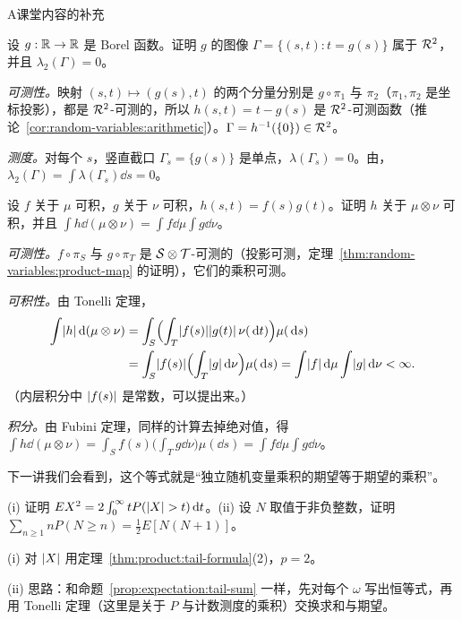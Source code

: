 \begin{exercises}{A}{课堂内容的补充}
\item\label{ex:product:A3} 设 $g:\mathbb{R}\to\mathbb{R}$ 是 Borel 函数。证明 $g$ 的图像 $\Gamma=\{(s,t):t=g(s)\}$ 属于 $\mathcal{R}^2$，并且 $\lambda_2(\Gamma)=0$。
\begin{solution}
\emph{可测性。}映射 $(s,t)\mapsto(g(s),t)$ 的两个分量分别是 $g\circ\pi_1$ 与 $\pi_2$（$\pi_1,\pi_2$ 是坐标投影），都是 $\mathcal{R}^2$-可测的，所以 $h(s,t)=t-g(s)$ 是 $\mathcal{R}^2$-可测函数（推论~\ref{cor:random-variables:arithmetic}）。$\Gamma=h^{-1}(\{0\})\in\mathcal{R}^2$。

\emph{测度。}对每个 $s$，竖直截口 $\Gamma_s=\{g(s)\}$ 是单点，$\lambda(\Gamma_s)=0$。由，$\lambda_2(\Gamma)=\int\lambda(\Gamma_s)\dd s=0$。
\end{solution}

\item\label{ex:product:A4} 设 $f$ 关于 $\mu$ 可积，$g$ 关于 $\nu$ 可积，$h(s,t)=f(s)g(t)$。证明 $h$ 关于 $\mu\otimes\nu$ 可积，并且 $\int h\dd(\mu\otimes\nu)=\int f\dd\mu\int g\dd\nu$。
\begin{solution}
\emph{可测性。}$f\circ\pi_S$ 与 $g\circ\pi_T$ 是 $\mathcal{S}\otimes\mathcal{T}$-可测的（投影可测，定理~\ref{thm:random-variables:product-map} 的证明），它们的乘积可测。

\emph{可积性。}由 Tonelli 定理，
\[
\begin{aligned}
\int\lvert h\rvert\,\mathrm{d}(\mu\otimes\nu)&=\int_S\Bigl(\int_T\lvert f(s)\rvert\lvert g(t)\rvert\,\nu(\,\mathrm{d} t)\Bigr)\mu(\,\mathrm{d} s)\\
&=\int_S\lvert f(s)\rvert\Bigl(\int_T\lvert g\rvert\,\mathrm{d}\nu\Bigr)\mu(\,\mathrm{d} s)=\int\lvert f\rvert\,\mathrm{d}\mu\int\lvert g\rvert\,\mathrm{d}\nu<\infty .
\end{aligned}
\]
（内层积分中 $\lvert f(s)\rvert$ 是常数，可以提出来。）

\emph{积分。}由 Fubini 定理，同样的计算去掉绝对值，得 $\int h\dd(\mu\otimes\nu)=\int_Sf(s)\bigl(\int_Tg\dd\nu\bigr)\mu(\dd s)=\int f\dd\mu\int g\dd\nu$。

下一讲我们会看到，这个等式就是“独立随机变量乘积的期望等于期望的乘积”。
\end{solution}

\item\label{ex:product:A5} (i) 证明 $EX^2=2\int_0^\infty tP(\lvert X\rvert>t)\,\mathrm{d} t$。(ii) 设 $N$ 取值于非负整数，证明 $\sum_{n\geqslant1}nP(N\geqslant n)=\frac12E[N(N+1)]$。
\begin{solution}
(i) 对 $\lvert X\rvert$ 用定理~\ref{thm:product:tail-formula}(2)，$p=2$。

(ii) 思路：和命题~\ref{prop:expectation:tail-sum} 一样，先对每个 $\omega$ 写出恒等式，再用 Tonelli 定理（这里是关于 $P$ 与计数测度的乘积）交换求和与期望。


\end{solution}
\end{exercises}
